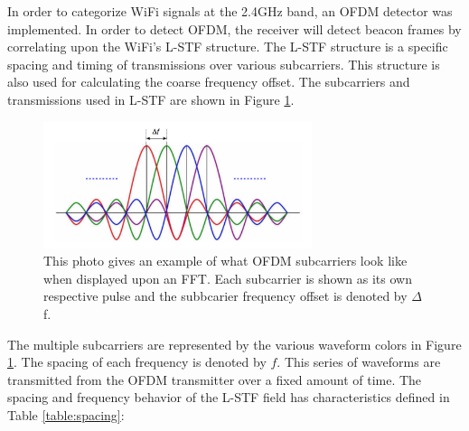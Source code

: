 In order to categorize WiFi signals at the 2.4GHz band, an OFDM detector was implemented. In order to detect OFDM, the receiver will detect beacon frames by correlating upon the WiFi’s L-STF structure. The L-STF structure is a specific spacing and timing of transmissions over various subcarriers. This structure is also used for calculating the coarse frequency offset. The subcarriers and transmissions used in L-STF are shown in Figure \ref{fig:ofdm_subcarriers}. \par 
\begin{figure}[ht!]
	\centering
	\includegraphics[width=0.70\textwidth]{img/ofdm-subcarriers}
	\caption{This photo gives an example of what OFDM subcarriers look like when displayed upon an FFT.  Each subcarrier is shown as its own respective pulse and the subbcarier frequency offset is denoted by $\Delta$ f.}
	\label{fig:ofdm_subcarriers}
\end{figure}\par
The multiple subcarriers are represented by the various waveform colors in Figure \ref{fig:ofdm_subcarriers}. The spacing of each frequency is denoted by $f$. This series of waveforms are transmitted from the OFDM transmitter over a fixed amount of time. The spacing and frequency behavior of the L-STF field has characteristics defined in Table \ref{table:spacing}: \par
